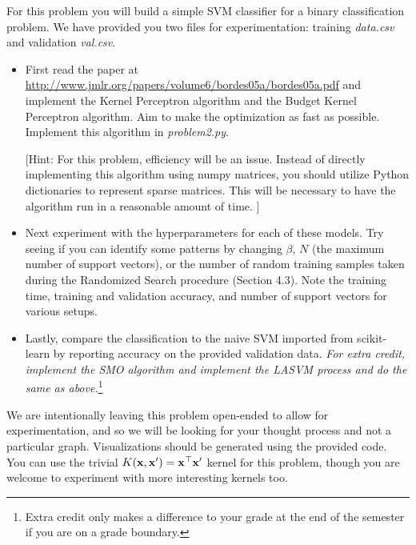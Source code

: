 \documentclass[submit]{harvardml}
\begin{document}
\begin{problem}


  For this problem you will build a simple SVM classifier for a binary
  classification problem. We have provided you two files for
  experimentation: training \textit{data.csv} and validation
  \textit{val.csv}.
\begin{itemize}
\item First read the paper at
  \url{http://www.jmlr.org/papers/volume6/bordes05a/bordes05a.pdf} and
  implement the Kernel Perceptron algorithm and the Budget Kernel
  Perceptron algorithm. Aim to make the optimization as fast as possible.
  Implement this algorithm in \textit{problem2.py}.

  [Hint: For this problem, efficiency will be an issue. Instead of directly
implementing this algorithm using numpy matrices, you should utilize
Python dictionaries to represent sparse matrices. This will be necessary 
to have the algorithm run in a reasonable amount of time.   
]
\item Next experiment with the hyperparameters for each of these
  models. Try seeing if you can identify some patterns by changing
  $\beta$, $N$ (the maximum number of support vectors), or the number
  of random training samples taken during the Randomized Search
  procedure (Section 4.3).  Note the training time, training and
  validation accuracy, and number of support vectors for various
  setups.
\item Lastly, compare the classification to the naive SVM imported from
scikit-learn by reporting accuracy on the provided validation
data. {\em For extra credit, implement the SMO algorithm and implement
  the LASVM process and do the same as above.}\footnote{Extra credit
  only makes a difference to your grade at the end of the semester if
  you are on a grade boundary.}

\end{itemize}


We are intentionally leaving this problem open-ended to allow for
experimentation, and so we will be looking for your thought process
and not a particular graph.  Visualizations should be generated 
using the provided code. You can use the trivial
$K(\mathbf{x},\mathbf{x}') = \mathbf{x}^\top \mathbf{x}'$ kernel for this problem,
though you are welcome to experiment with more interesting kernels
too.



\end{problem}
\end{document}
